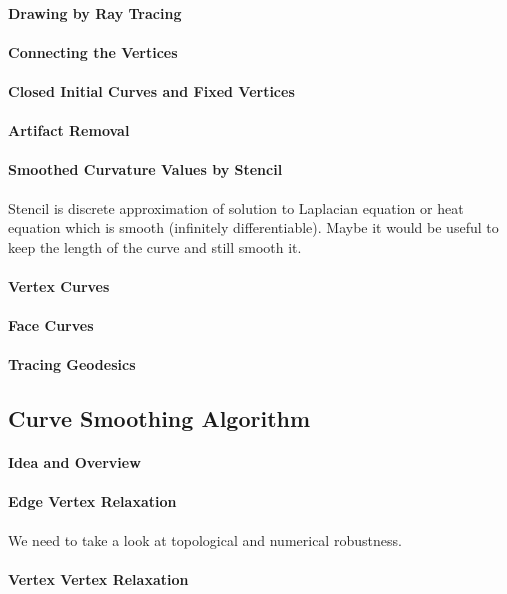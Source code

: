 \documentclass{stdlocal}
\begin{document}
  \paragraph{Drawing by Ray Tracing}
  \paragraph{Connecting the Vertices}
  \paragraph{Closed Initial Curves and Fixed Vertices}
  \paragraph{Artifact Removal}
  \paragraph{Smoothed Curvature Values by Stencil}
    Stencil is discrete approximation of solution to Laplacian equation or heat equation which is smooth (infinitely differentiable).
    Maybe it would be useful to keep the length of the curve and still smooth it.
  \paragraph{Vertex Curves}
  \paragraph{Face Curves}
  \paragraph{Tracing Geodesics}

\subsection{Curve Smoothing Algorithm} %
\label{sub:curve_smoothing_algorithm}
  \paragraph{Idea and Overview}
  \paragraph{Edge Vertex Relaxation}
    We need to take a look at topological and numerical robustness.
  \paragraph{Vertex Vertex Relaxation}
\end{document}
